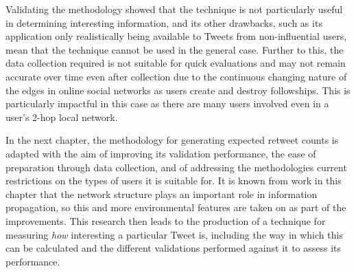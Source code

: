 Validating the methodology showed that the technique is not particularly useful in determining interesting information, and its other drawbacks, such as its application only realistically being available to Tweets from non-influential users, mean that the technique cannot be used in the general case. Further to this, the data collection required is not suitable for quick evaluations and may not remain accurate over time even after collection due to the continuous changing nature of the edges in online social networks as users create and destroy followships. This is particularly impactful in this case as there are many users involved even in a user's 2-hop local network.

In the next chapter, the methodology for generating expected retweet counts is adapted with the aim of improving its validation performance, the ease of preparation through data collection, and of addressing the methodologies current restrictions on the types of users it is suitable for. It is known from work in this chapter that the network structure plays an important role in information propagation, so this and more environmental features are taken on as part of the improvements. This research then leads to the production of a technique for measuring \textit{how} interesting a particular Tweet is, including the way in which this can be calculated and the different validations performed against it to assess its performance.
